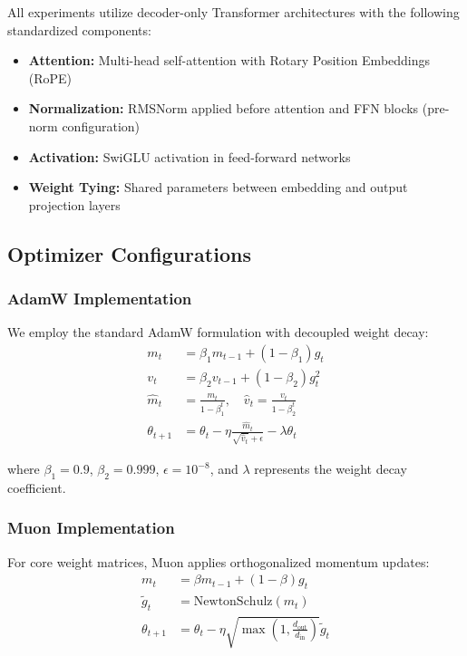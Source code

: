 \documentclass[11pt,a4paper]{article}
\begin{document}
All experiments utilize decoder-only Transformer architectures with the following standardized components:
\begin{itemize}[leftmargin=*]
    \item \textbf{Attention:} Multi-head self-attention with Rotary Position Embeddings (RoPE) \cite{su2021roformer}
    \item \textbf{Normalization:} RMSNorm applied before attention and FFN blocks (pre-norm configuration)
    \item \textbf{Activation:} SwiGLU activation in feed-forward networks
    \item \textbf{Weight Tying:} Shared parameters between embedding and output projection layers
\end{itemize}

\subsection{Optimizer Configurations}

\subsubsection{AdamW Implementation}
We employ the standard AdamW formulation with decoupled weight decay:
\begin{align}
    m_t &= \beta_1 m_{t-1} + (1-\beta_1) g_t \\
    v_t &= \beta_2 v_{t-1} + (1-\beta_2) g_t^2 \\
    \hat{m}_t &= \frac{m_t}{1-\beta_1^t}, \quad \hat{v}_t = \frac{v_t}{1-\beta_2^t} \\
    \theta_{t+1} &= \theta_t - \eta \frac{\hat{m}_t}{\sqrt{\hat{v}_t} + \epsilon} - \lambda \theta_t
\end{align}

where $\beta_1 = 0.9$, $\beta_2 = 0.999$, $\epsilon = 10^{-8}$, and $\lambda$ represents the weight decay coefficient.

\subsubsection{Muon Implementation}
For core weight matrices, Muon applies orthogonalized momentum updates:
\begin{align}
    m_t &= \beta m_{t-1} + (1-\beta) g_t \\
    \tilde{g}_t &= \text{NewtonSchulz}(m_t) \\
    \theta_{t+1} &= \theta_t - \eta \sqrt{\max\left(1, \frac{d_{\text{out}}}{d_{\text{in}}}\right)} \tilde{g}_t
\end{align}
\end{document}
